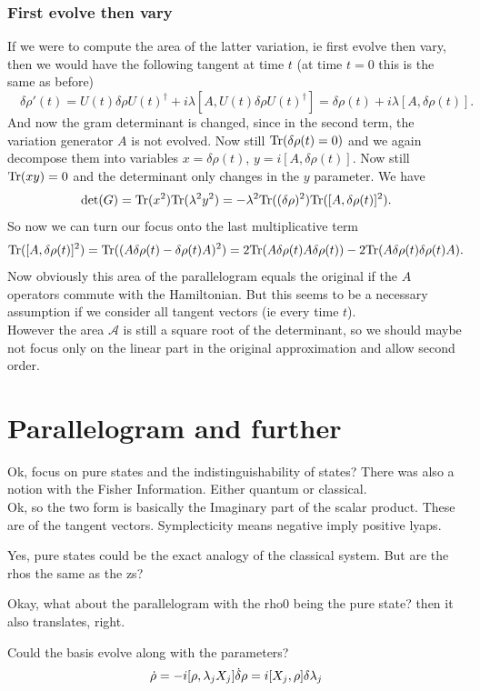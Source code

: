 \documentclass{article}
\begin{document}
\subsubsection{First evolve then vary}
If we were to compute the area of the latter variation, ie first evolve then vary, then we would have the following tangent at time $t$ (at time $t=0$ this is the same as before)
\[
    \quad \delta\rho'(t) = U(t)\delta \rho U(t)^\dag + i\lambda [A, U(t)\delta\rho U(t)^\dag] = \delta \rho(t) + i\lambda [A, \delta\rho(t)].
\]
And now the gram determinant is changed, since in the second term, the variation generator $A$ is not evolved. Now still $\text{Tr}(\delta\rho(t)=0)$ and we again decompose them into variables $x = \delta\rho(t)$, $y = i[A, \delta\rho(t)]$. Now still $\text{Tr}(xy) =0$ and the determinant only changes in the $y$ parameter. We have 
\[
    \text{det}(G) = \text{Tr}(x^2)\text{Tr}(\lambda^2 y^2) = -\lambda^2\text{Tr}((\delta\rho)^2)\text{Tr}([A,\delta\rho(t)]^2).
\]
So now we can turn our focus onto the last multiplicative term
\[
    \text{Tr}([A,\delta\rho(t)]^2) = \text{Tr}((A\delta\rho(t) - \delta\rho(t)A)^2) = 2\text{Tr}(A\delta\rho(t)A\delta\rho(t)) - 2\text{Tr}(A\delta\rho(t)\delta\rho(t)A).
\]
Now obviously this area of the parallelogram equals the original if the $A$ operators commute with the Hamiltonian. But this seems to be a necessary assumption if we consider all tangent vectors (ie every time $t$).\\
However the area $\mathcal{A}$ is still a square root of the determinant, so we should maybe not focus only on the linear part in the original approximation and allow second order.

 \section{Parallelogram and further}
 Ok, focus on pure states and the indistinguishability of states? There was also a notion with the Fisher Information. Either quantum or classical. \\
 Ok, so the two form is basically the Imaginary part of the scalar product. These are of the tangent vectors. Symplecticity means negative imply positive lyaps. 

 Yes, pure states could be the exact analogy of the classical system. But are the rhos the same as the zs?

 Okay, what about the parallelogram with the rho0 being the pure state? then it also translates, right. 

 Could the basis evolve along with the parameters? 
 \[
    \dot \rho  = -i[\rho, \lambda_jX_j]\\
    \dot\delta\rho = i[X_j, \rho]\delta\lambda_j
 \]
\end{document}
